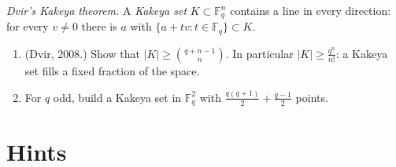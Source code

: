 \begin{exercise}[$\star\star$]\label{pb:kakeya}
\emph{Dvir's Kakeya theorem.} A \emph{Kakeya set} $K\subset\mathbb F_q^n$ contains a line in every direction: for every
$v\ne0$ there is $a$ with $\{a+tv:t\in\mathbb F_q\}\subset K$.
\begin{enumerate}[label=(\alph*)]
\item (Dvir, 2008.) Show that $|K|\ge\binom{q+n-1}n$. In particular $|K|\ge\frac{q^n}{n!}$: a Kakeya set fills a fixed fraction
of the space.
\item For $q$ odd, build a Kakeya set in $\mathbb F_q^2$ with $\frac{q(q+1)}2+\frac{q-1}2$ points.
\end{enumerate}
\end{exercise}

\section{Hints}

